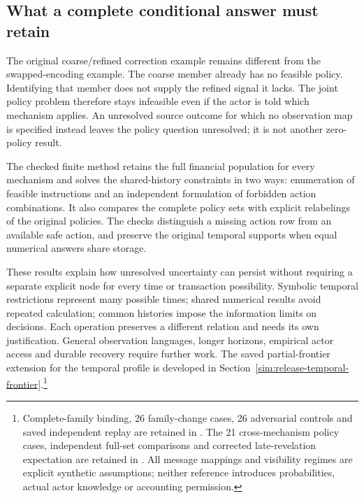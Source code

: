 \pagebreak
\subsection{What a complete conditional answer must retain}

The original coarse/refined correction example remains different from the swapped-encoding example. The coarse member already has no feasible policy. Identifying that member does not supply the refined signal it lacks. The joint policy problem therefore stays infeasible even if the actor is told which mechanism applies. An unresolved source outcome for which no observation map is specified instead leaves the policy question unresolved; it is not another zero-policy result.

The checked finite method retains the full financial population for every mechanism and solves the shared-history constraints in two ways: enumeration of feasible instructions and an independent formulation of forbidden action combinations. It also compares the complete policy sets with explicit relabelings of the original policies. The checks distinguish a missing action row from an available safe action, and preserve the original temporal supports when equal numerical answers share storage.

These results explain how unresolved uncertainty can persist without requiring a separate explicit node for every time or transaction possibility. Symbolic temporal restrictions represent many possible times; shared numerical results avoid repeated calculation; common histories impose the information limits on decisions. Each operation preserves a different relation and needs its own justification. General observation languages, longer horizons, empirical actor access and durable recovery require further work. The saved partial-frontier extension for the temporal profile is developed in Section~\ref{sim:release-temporal-frontier}.\footnote{Complete-family binding, 26 family-change cases, 26 adversarial controls and saved independent replay are retained in . The 21 cross-mechanism policy cases, independent full-set comparisons and corrected late-revelation expectation are retained in . All message mappings and visibility regimes are explicit synthetic assumptions; neither reference introduces probabilities, actual actor knowledge or accounting permission.}
